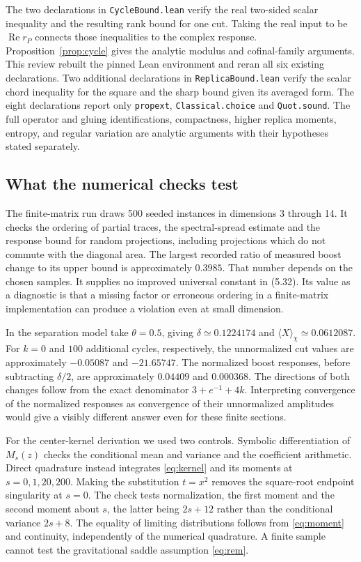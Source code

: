 \documentclass[11pt]{article}
\begin{document}
The two declarations in \texttt{CycleBound.lean} verify the real two-sided scalar inequality and the resulting rank bound for one cut. Taking the real input to be $\operatorname{Re}r_P$ connects those inequalities to the complex response. Proposition~\ref{prop:cycle} gives the analytic modulus and cofinal-family arguments. This review rebuilt the pinned Lean environment and reran all six existing declarations. Two additional declarations in \texttt{ReplicaBound.lean} verify the scalar chord inequality for the square and the sharp bound given its averaged form. The eight declarations report only \texttt{propext}, \texttt{Classical.choice} and \texttt{Quot.sound}. The full operator and gluing identifications, compactness, higher replica moments, entropy, and regular variation are analytic arguments with their hypotheses stated separately.

\subsection{What the numerical checks test}
The finite-matrix run draws 500 seeded instances in dimensions 3 through 14. It checks the ordering of partial traces, the spectral-spread estimate and the response bound for random projections, including projections which do not commute with the diagonal area. The largest recorded ratio of measured boost change to its upper bound is approximately $0.3985$. That number depends on the chosen samples. It supplies no improved universal constant in (5.32). Its value as a diagnostic is that a missing factor or erroneous ordering in a finite-matrix implementation can produce a violation even at small dimension.

In the separation model take $\theta=0.5$, giving $\delta\simeq0.1224174$ and $\langle X\rangle_\chi\simeq0.0612087$. For $k=0$ and $100$ additional cycles, respectively, the unnormalized cut values are approximately $-0.05087$ and $-21.65747$. The normalized boost responses, before subtracting $\delta/2$, are approximately $0.04409$ and $0.000368$. The directions of both changes follow from the exact denominator $3+e^{-1}+4k$. Interpreting convergence of the normalized responses as convergence of their unnormalized amplitudes would give a visibly different answer even for these finite sections.

For the center-kernel derivation we used two controls. Symbolic differentiation of $M_s(z)$ checks the conditional mean and variance and the coefficient arithmetic. Direct quadrature instead integrates \eqref{eq:kernel} and its moments at $s=0,1,20,200$. Making the substitution $t=x^2$ removes the square-root endpoint singularity at $s=0$. The check tests normalization, the first moment and the second moment about $s$, the latter being $2s+12$ rather than the conditional variance $2s+8$. The equality of limiting distributions follows from \eqref{eq:moment} and continuity, independently of the numerical quadrature. A finite sample cannot test the gravitational saddle assumption \eqref{eq:rem}.
\end{document}

